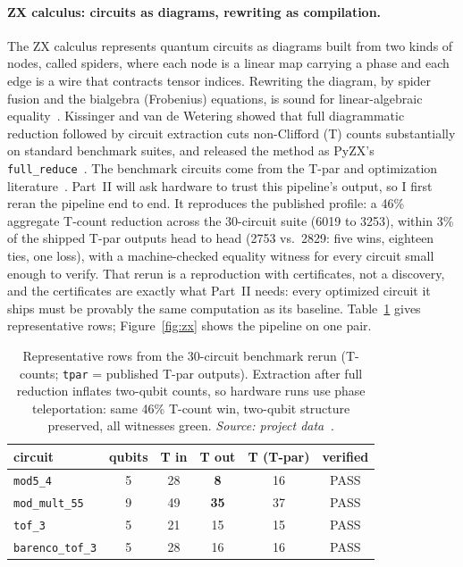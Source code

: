 \paragraph{ZX calculus: circuits as diagrams, rewriting as compilation.} The ZX calculus represents quantum circuits as diagrams built from two kinds of nodes, called spiders, where each node is a linear map carrying a phase and each edge is a wire that contracts tensor indices. Rewriting the diagram, by spider fusion and the bialgebra (Frobenius) equations, is sound for linear-algebraic equality~\cite{coecke2011interacting}. Kissinger and van de Wetering showed that full diagrammatic reduction followed by circuit extraction cuts non-Clifford (T) counts substantially on standard benchmark suites, and released the method as PyZX's \texttt{full\_reduce}~\cite{kissinger2020reducing,kissinger2019pyzx}. The benchmark circuits come from the T-par and optimization literature~\cite{amy2014tpar,nam2018automated}. Part~II will ask hardware to trust this pipeline's output, so I first reran the pipeline end to end. It reproduces the published profile: a 46\% aggregate T-count reduction across the 30-circuit suite (6019 to 3253), within 3\% of the shipped T-par outputs head to head (2753 vs.\ 2829: five wins, eighteen ties, one loss), with a machine-checked equality witness for every circuit small enough to verify. That rerun is a reproduction with certificates, not a discovery, and the certificates are exactly what Part~II needs: every optimized circuit it ships must be provably the same computation as its baseline. Table~\ref{tab:tracka} gives representative rows; Figure~\ref{fig:zx} shows the pipeline on one pair.

\begin{table}[htbp]
\centering\footnotesize
\caption{Representative rows from the 30-circuit benchmark rerun (T-counts; \texttt{tpar} = published T-par outputs). Extraction after full reduction inflates two-qubit counts, so hardware runs use phase teleportation: same 46\% T-count win, two-qubit structure preserved, all witnesses green. \emph{Source: project data~\cite{appliedrepo2026}.}}
\label{tab:tracka}
\begin{tabular}{lccccc}
\toprule
circuit & qubits & T in & T out & T (T-par) & verified \\
\midrule
\texttt{mod5\_4} & 5 & 28 & \textbf{8} & 16 & PASS \\
\texttt{mod\_mult\_55} & 9 & 49 & \textbf{35} & 37 & PASS \\
\texttt{tof\_3} & 5 & 21 & 15 & 15 & PASS \\
\texttt{barenco\_tof\_3} & 5 & 28 & 16 & 16 & PASS \\
\bottomrule
\end{tabular}
\end{table}

